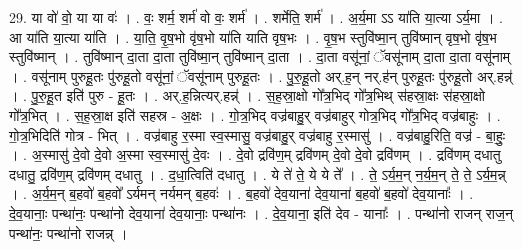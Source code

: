 \documentclass[17pt]{extarticle}
\begin{document}
29. या वो॑ वो॒ या या वः॑ । . वः॒ शर्म॒ शर्म॑ वो वः॒ शर्म॑ । . शर्मेति॒ शर्म॑ । . अ॒र्य॒मा ऽऽ या॑ति या॒त्या ऽर्य॒मा । . आ या॑ति या॒त्या या॑ति । . या॒ति॒ वृ॒ष॒भो वृ॑ष॒भो या॑ति याति वृष॒भः । . वृ॒ष॒भ स्तुवि॑ष्मा॒न् तुवि॑ष्मान् वृष॒भो वृ॑ष॒भ स्तुवि॑ष्मान् । . तुवि॑ष्मान् दा॒ता दा॒ता तुवि॑ष्मा॒न् तुवि॑ष्मान् दा॒ता । . दा॒ता वसू॑नां॒ ॅवसू॑नाम् दा॒ता दा॒ता वसू॑नाम् । . वसू॑नाम् पुरुहू॒तः पु॑रुहू॒तो वसू॑नां॒ ॅवसू॑नाम् पुरुहू॒तः । . पु॒रु॒हू॒तो अर्.ह॒न् नर्.ह॑न् पुरुहू॒तः पु॑रुहू॒तो अर्.हन्न्॑ । . पु॒रु॒हू॒त इति॑ पुरु - हू॒तः । . अर्.ह॒न्नित्यर्.हन्न्॑ । . स॒ह॒स्रा॒क्षो गो᳚त्र॒भिद् गो᳚त्र॒भिथ् स॑हस्रा॒क्षः स॑हस्रा॒क्षो गो᳚त्र॒भित् । . स॒ह॒स्रा॒क्ष इति॑ सहस्र - अ॒क्षः । . गो॒त्र॒भिद् वज्र॑बाहु॒र् वज्र॑बाहुर् गोत्र॒भिद् गो᳚त्र॒भिद् वज्र॑बाहुः । . गो॒त्र॒भिदिति॑ गोत्र - भित् । . वज्र॑बाहु र॒स्मा स्व॒स्मासु॒ वज्र॑बाहु॒र् वज्र॑बाहु र॒स्मासु॑ । . वज्र॑बाहु॒रिति॒ वज्र॑ - बा॒हुः॒ । . अ॒स्मासु॑ दे॒वो दे॒वो अ॒स्मा स्व॒स्मासु॑ दे॒वः । . दे॒वो द्रवि॑ण॒म् द्रवि॑णम् दे॒वो दे॒वो द्रवि॑णम् । . द्रवि॑णम् दधातु दधातु॒ द्रवि॑ण॒म् द्रवि॑णम् दधातु । . द॒धा॒त्विति॑ दधातु । . ये ते॑ ते॒ ये ये ते᳚ । . ते॒ ऽर्य॒म॒न् न॒र्य॒म॒न् ते॒ ते॒ ऽर्य॒म॒न्न् । . अ॒र्य॒म॒न् ब॒हवो॑ ब॒हवो᳚ ऽर्यमन् नर्यमन् ब॒हवः॑ । . ब॒हवो॑ देव॒याना॑ देव॒याना॑ ब॒हवो॑ ब॒हवो॑ देव॒यानाः᳚ । . दे॒व॒यानाः॒ पन्था॑नः॒ पन्था॑नो देव॒याना॑ देव॒यानाः॒ पन्था॑नः । . दे॒व॒याना॒ इति॑ देव - यानाः᳚ । . पन्था॑नो राजन् राज॒न् पन्था॑नः॒ पन्था॑नो राजन्न् । \newline
\end{document}
